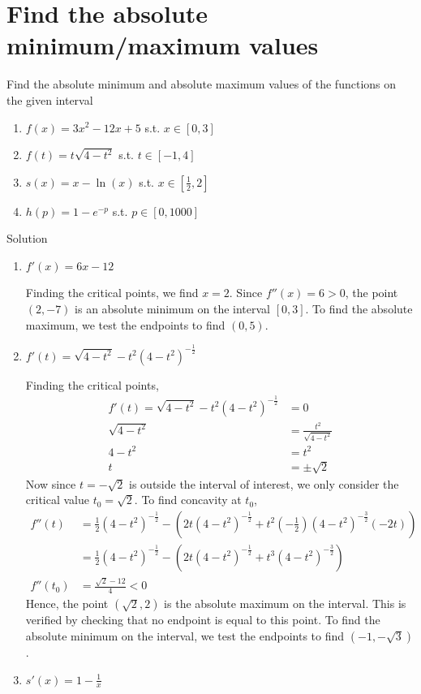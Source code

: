 \documentclass[12pt]{article}
\begin{document}
\section{Find the absolute minimum/maximum values}
Find the absolute minimum and absolute maximum values of the functions on the given interval
\begin{enumerate}
    \item $f(x) = 3x^2 -12x + 5$ s.t. $x\in [0,3]$
    \item $f(t) = t\sqrt{4-t^2}$ s.t. $ t \in [-1,4]$
    \item $s(x) = x-\ln(x)$ s.t. $x \in [\frac{1}{2},2]$
    \item $h(p) = 1-e^{-p}$ s.t. $p \in [0,1000]$
\end{enumerate}
Solution
\begin{enumerate}
    \item $f'(x) = 6x -12$
    
    Finding the critical points, we find $x=2$. Since $f''(x)=6>0$, the point $(2,-7)$ is an absolute minimum on the interval $[0,3]$. To find the absolute maximum, we test the endpoints to find $(0,5).$
    
    \item $f'(t) =\sqrt{4-t^2} -t^2(4-t^2)^{-\frac{1}{2}}$

    Finding the critical points, 
    \begin{align*}
        f'(t) = \sqrt{4-t^2} -t^2(4-t^2)^{-\frac{1}{2}} &= 0 
        \\ \sqrt{4-t^2} &= \frac{t^2}{\sqrt{4-t^2}}
        \\ 4-t^2 &= t^2
        \\ t &= \pm \sqrt{2}
    \end{align*}
    Now since $t=-\sqrt{2}$ is outside the interval of interest, we only consider the critical value $t_0=\sqrt{2}$. To find concavity at $t_0$,
    \begin{align*}
         f''(t) &= \frac{1}{2}(4-t^2)^{-\frac{1}{2}} - \left(2t(4-t^2)^{-\frac{1}{2}} + t^2\left(-\frac{1}{2}\right)(4- t^2)^{-\frac{3}{2}}(-2t) \right)
         \\ &= \frac{1}{2}(4-t^2)^{-\frac{1}{2}} - \left(2t(4-t^2)^{-\frac{1}{2}} + t^3(4- t^2)^{-\frac{3}{2}} \right)
         \\ f''(t_0) &= \frac{\sqrt{2}-12}{4}<0
    \end{align*}
    Hence, the point $(\sqrt{2},2)$ is the absolute maximum on the interval. This is verified by checking that no endpoint is equal to this point. To find the absolute minimum on the interval, we test the endpoints to find $(-1,-\sqrt{3})$. 
    \item $s'(x) = 1-\frac{1}{x}$


\end{enumerate}
\end{document}
